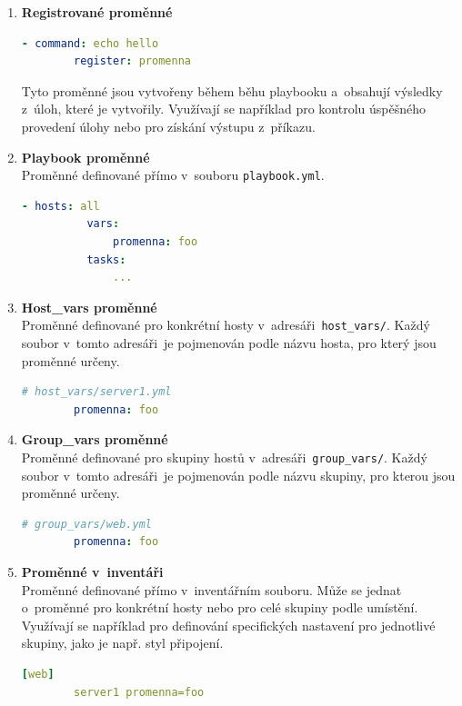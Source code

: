 \begin{itemize}
\begin{enumerate}
        \item \textbf{Registrované proměnné}
        \begin{lstlisting}[language=YAML, caption={Registrované proměnné}, label={lst:ansibleregisteredvar}, captionpos=b]
        - command: echo hello
        register: promenna
        \end{lstlisting}
        Tyto proměnné jsou vytvořeny během běhu playbooku a~obsahují výsledky z~úloh, které je vytvořily. 
        Využívají se například pro kontrolu úspěšného provedení úlohy nebo pro získání výstupu z~příkazu.

        \item \textbf{Playbook proměnné} \\
        Proměnné definované přímo v~souboru \texttt{playbook.yml}.
        \begin{lstlisting}[language=YAML, caption={Playbook proměnné}, label={lst:ansibleplaybookvar}, captionpos=b]
        - hosts: all
          vars:
              promenna: foo
          tasks:
              ...
        \end{lstlisting}

        \item \textbf{Host\_vars proměnné} \\
        Proměnné definované pro konkrétní hosty v~adresáři~\texttt{host\_vars/}. 
        Každý soubor v~tomto adresáři~je pojmenován podle názvu hosta, pro který jsou proměnné určeny.
        \begin{lstlisting}[language=YAML, caption={Proměnné hostů}, label={lst:ansiblehostvars}, captionpos=b]
        # host_vars/server1.yml
        promenna: foo
        \end{lstlisting}

        \item \textbf{Group\_vars proměnné} \\
        Proměnné definované pro skupiny hostů v~adresáři~\texttt{group\_vars/}. 
        Každý soubor v~tomto adresáři~je pojmenován podle názvu skupiny, pro kterou jsou proměnné určeny.
        \begin{lstlisting}[language=YAML, caption={Proměnné skupin}, label={lst:ansiblegroupvars}, captionpos=b]
        # group_vars/web.yml
        promenna: foo
        \end{lstlisting}

        \item \textbf{Proměnné v~inventáři} \\
        Proměnné definované přímo v~inventářním souboru. 
        Může se jednat o~proměnné pro konkrétní hosty nebo pro celé skupiny podle umístění. 
        Využívají se například pro definování specifických nastavení pro jednotlivé skupiny, jako je např. styl připojení.
        \begin{lstlisting}[language=YAML, caption={Proměnné v~inventáři}, label={lst:ansibleinventoryvar}, captionpos=b]
        [web]
        server1 promenna=foo
        \end{lstlisting}


\end{enumerate}
\end{itemize}
